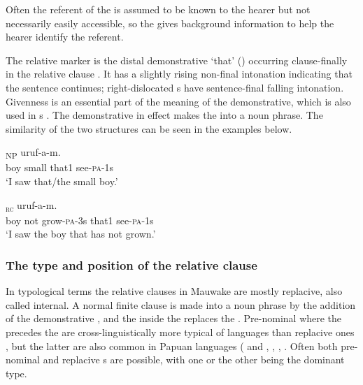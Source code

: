 Often the referent of the  is assumed to be known to the hearer but not necessarily easily accessible, so the  gives background information to help the hearer identify the referent. 

The relative marker is the distal demonstrative  `that' () occurring clause-finally in the relative clause . It has a slightly rising non-final intonation indicating that the sentence continues; right-dislocated s have sentence-final falling intonation. Givenness is an essential part of the meaning of the demonstrative, which is also used in s . The demonstrative in effect makes the  into a noun phrase. The similarity of the two structures can be seen in the examples below.

\ea%
\label{ex:8:x1527}
\textsubscript{NP}  uruf-a-m.\\
boy  small  that1  see-\textsc{pa}-1s      \\
\glt`I saw that/the small boy.'
\z


\ea%
\label{ex:8:x1528}
\textsubscript{\textsc{rc}}  uruf-a-m. \\
boy  not  grow-\textsc{pa}-3s that1 see-\textsc{pa}-1s \\
\glt`I saw the boy that has not grown.'
\z


\subsubsection{The type and position of the relative clause}

In typological terms the relative clauses in Mauwake are mostly replacive, also called internal. A normal finite clause is made into a noun phrase by the addition of the demonstrative , and the  inside the  replaces the . Pre-nominal  where the precedes the  are cross-linguistically more typical of  languages than replacive ones \citep[144]{Keenan1985}, but the latter are also common in Papuan languages (\citealt[229]{Reesink1983b} and \citealt[219]{Reesink1987}, \citealt[49]{Roberts1987}, \citealt[281]{Farr1999}, \citealt[193]{Whitehead2004}. Often both pre-nominal and replacive s are possible, with one or the other being the dominant type.

